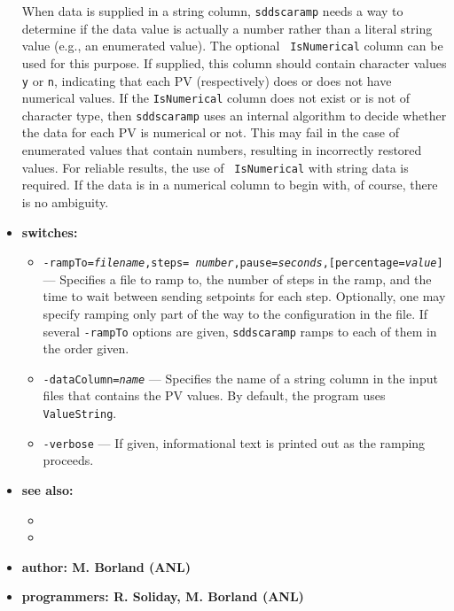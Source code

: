 \begin{itemize}
When data is supplied in a string column, {\tt sddscaramp} needs a way
to determine if the data value is actually a number rather than a
literal string value (e.g., an enumerated value).  The optional {\tt
IsNumerical} column can be used for this purpose.  If supplied, this
column should contain character values {\tt y} or {\tt n}, indicating
that each PV (respectively) does or does not have numerical values.
If the {\tt IsNumerical} column does not exist or is not of character
type, then {\tt sddscaramp} uses an internal algorithm to decide
whether the data for each PV is numerical or not.  This may fail in
the case of enumerated values that contain numbers, resulting in
incorrectly restored values.  For reliable results, the use of {\tt
IsNumerical} with string data is required.  If the data is in a
numerical column to begin with, of course, there is no ambiguity.

%
\item {\bf switches:}
%
%
    \begin{itemize}
        \item {\tt -rampTo={\em filename},steps={\em
        number},pause={\em seconds},[percentage={\em value}]} ---
        Specifies a file to ramp to, the number of steps in the ramp,
        and the time to wait between sending setpoints for each step.
        Optionally, one may specify ramping only part of the way to
        the configuration in the file.  If several {\tt -rampTo}
        options are given, {\tt sddscaramp} ramps to each of them
        in the order given.
        \item {\tt -dataColumn={\em name}} --- Specifies the name of
        a string column in the input files that contains the PV values.
        By default, the program uses {\tt ValueString}.
        \item {\tt -verbose} --- If given, informational text is printed out
        as the ramping proceeds.
    \end{itemize}

\item {\bf see also:}
    \begin{itemize}
%
%
    \item {}
    \item {}
    \end{itemize}
%
%
\item {\bf author: M. Borland (ANL)}
\item {\bf programmers: R. Soliday, M. Borland (ANL)}
\end{itemize}
